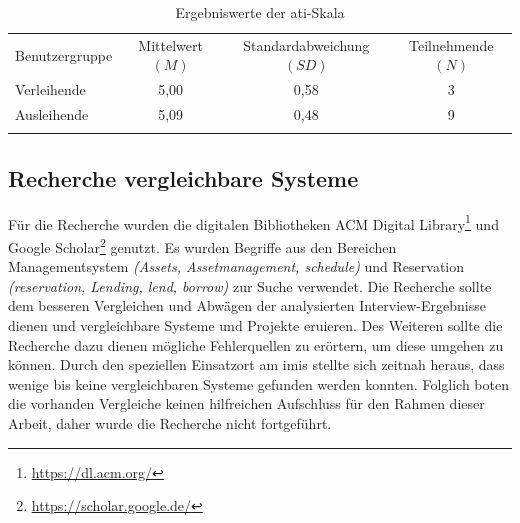\begin{table}[h]
        \centering
        \caption{Ergebniswerte der \ac{ati}-Skala}
        \begin{tabular}{lccc}
                \arrayrulecolor{maincolor}\hline
                \sffamily\color{maincolor}Benutzergruppe & \sffamily\color{maincolor}Mittelwert
                $(M)$                                    & \sffamily\color{maincolor}Standardabweichung $(SD)$ &
                \sffamily\color{maincolor}Teilnehmende $(N)$                                                          \\
                \arrayrulecolor{maincolor}\hline
                Verleihende                              & 5,00                                                & 0,58
                                                         & 3                                                          \\
                Ausleihende                              & 5,09                                                & 0,48
                                                         & 9                                                          \\
                \arrayrulecolor{maincolor}\hline
        \end{tabular}
        \label{table:ati}
\end{table}

\subsection{Recherche vergleichbare Systeme}
\label{subsection:system}
Für die Recherche wurden die digitalen Bibliotheken ACM Digital
Library\footnote{\url{https://dl.acm.org/}} und Google
Scholar\footnote{\url{https://scholar.google.de/}} genutzt. Es wurden Begriffe aus den Bereichen
Managementsystem \textit{(Assets, Assetmanagement, schedule)} und Reservation \textit{(reservation,
Lending, lend, borrow)} zur Suche verwendet. Die Recherche sollte dem besseren Vergleichen und
Abwägen der analysierten Interview-Ergebnisse dienen und vergleichbare Systeme und Projekte
eruieren. Des Weiteren sollte die Recherche dazu dienen mögliche Fehlerquellen zu erörtern, um diese
umgehen zu können. Durch den speziellen Einsatzort am \ac{imis} stellte sich zeitnah heraus, dass
wenige bis keine vergleichbaren Systeme gefunden werden konnten. Folglich boten die vorhanden
Vergleiche keinen hilfreichen Aufschluss für den Rahmen dieser Arbeit, daher wurde die Recherche
nicht fortgeführt.

